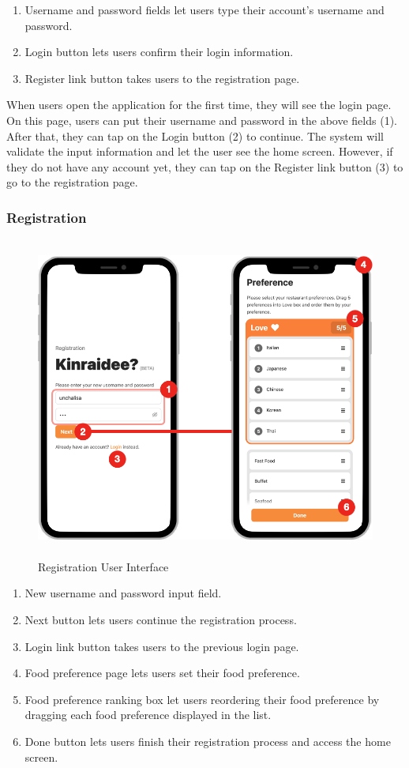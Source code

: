 \documentclass[12pt,oneside,openright,a4paper]{cpe-english-project}
\begin{document}
\begin{enumerate}
\item Username and password fields let users type their account’s username and password.
\item Login button lets users confirm their login information.
\item Register link button takes users to the registration page.
\end{enumerate}

When users open the application for the first time, they will see the login page. On this page, users can put their username and password in the above fields (1). After that, they can tap on the Login button (2) to continue. The system will validate the input information and let the user see the home screen. However, if they do not have any account yet, they can tap on the Register link button (3) to go to the registration page.

\newpage
\subsubsection{Registration}
\begin{figure}[H]\centering
\includegraphics[height=300pt]{./images/4ui_RegistrationUserInterface.png}
\caption{Registration User Interface}\label{fig:4ui_RegistrationUserInterface}
\end{figure}\vspace{-24pt}

\begin{enumerate}
\item New username and password input field.
\item Next button lets users continue the registration process.
\item Login link button takes users to the previous login page.
\item Food preference page lets users set their food preference.
\item Food preference ranking box let users reordering their food preference by dragging each food preference displayed in the list.
\item Done button lets users finish their registration process and access the home screen.
\end{enumerate}
\end{document}
